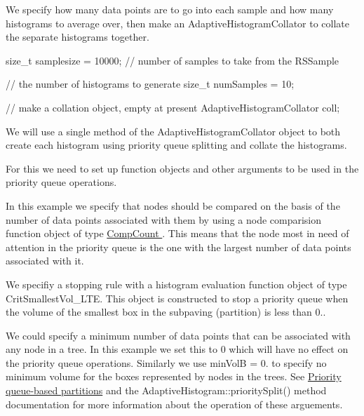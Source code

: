 \-We specify how many data points are to go into each sample and how many histograms to average over, then make an \-Adaptive\-Histogram\-Collator to collate the separate histograms together.


\begin{DoxyCodeInclude}
    size_t samplesize = 10000; // number of samples to take from the RSSample

    // the number of histograms to generate
    size_t numSamples = 10;

    // make a collation object, empty at present
    AdaptiveHistogramCollator coll;

\end{DoxyCodeInclude}


\-We will use a single method of the \-Adaptive\-Histogram\-Collator object to both create each histogram using priority queue splitting and collate the histograms.

\-For this we need to set up function objects and other arguments to be used in the priority queue operations.

\-In this example we specify that nodes should be compared on the basis of the number of data points associated with them by using a node comparision function object of type \hyperlink{classsubpavings_1_1CompCount}{\-Comp\-Count }. \-This means that the node most in need of attention in the priority queue is the one with the largest number of data points associated with it.

\-We specifiy a stopping rule with a histogram evaluation function object of type \-Crit\-Smallest\-Vol\-\_\-\-L\-T\-E. \-This object is constructed to stop a priority queue when the volume of the smallest box in the subpaving (partition) is less than 0..

\-We could specify a minimum number of data points that can be associated with any node in a tree. \-In this example we set this to 0 which will have no effect on the priority queue operations. \-Similarly we use min\-Vol\-B = 0. to specify no minimum volume for the boxes represented by nodes in the trees. \-See \hyperlink{AdaptiveHistograms_adhsubsec_pq}{\-Priority queue-\/based partitions} and the \-Adaptive\-Histogram\-::priority\-Split() method documentation for more information about the operation of these arguements.


